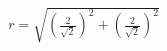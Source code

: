 \documentclass[preview]{standalone}
\begin{document}
\begin{align*}
r = \sqrt{\left(\frac{2}{\sqrt{2}}\right)^2 + \left(\frac{2}{\sqrt{2}}\right)^2}
\end{align*}
\end{document}
